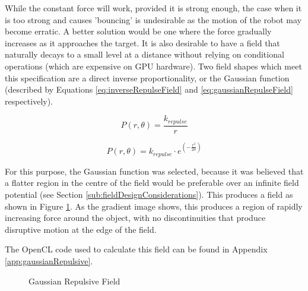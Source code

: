 \documentclass[10pt]{article}
\begin{document}
While the constant force will work, provided it is strong enough, the case when
it is too strong and causes 'bouncing' is undesirable as the motion of the robot
may become erratic. A better solution would be one where the force gradually
increases as it approaches the target. It is also desirable to have a field that
naturally decays to a small level at a distance without relying on conditional
operations (which are expensive on GPU hardware). Two field shapes which meet
this specification are a direct inverse proportionality, or the Gaussian
function (described by Equations \ref{eq:inverseRepulseField} and
\ref{eq:gaussianRepulseField} respectively).

\begin{equation}
P\left(r,\theta\right)=\frac{k_{repulse}}{r}\label{eq:inverseRepulseField}
\end{equation}

\begin{equation}
P\left(r,\theta\right)=k_{repulse}\cdot
e^{\left(-\frac{r^{2}}{2\sigma}\right)}\label{eq:gaussianRepulseField}
\end{equation}

For this purpose, the Gaussian function was selected, because it was believed
that a flatter region in the centre of the field would be preferable over an
infinite field potential (see Section \ref{sub:fieldDesignConsiderations}). This
produces a field as shown in Figure \ref{fig:gaussianField}. As the gradient
image shows, this produces a region of rapidly increasing force around the
object, with no discontinuities that produce disruptive motion at the edge of
the field.

The OpenCL code used to calculate this field can be found in Appendix
\ref{app:gaussianRepulsive}.

\begin{figure}
 \centering
 \caption{Gaussian Repulsive Field}
 \label{fig:gaussianField}
\end{figure}
\end{document}

